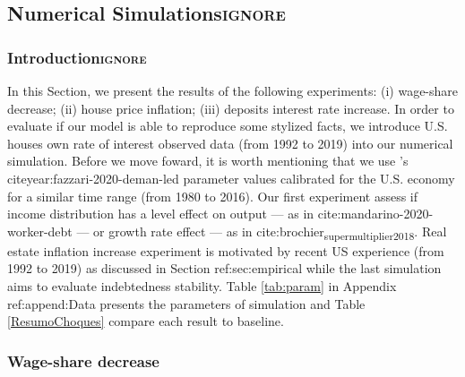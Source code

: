 \documentclass[12pt]{article}
\begin{document}
\subsection{Numerical Simulations\hfill{}\textsc{ignore}}
\label{sec:org3f9a5d6}
\label{sec:Experiments}

\subsubsection{Introduction\hfill{}\textsc{ignore}}
\label{sec:org95a2f11}

In this Section, we present the results of the following experiments: 
    (i) wage-share decrease;
    (ii) house price inflation;
    (iii) deposits interest rate increase.
In order to evaluate if our model is able to reproduce some stylized facts, we introduce U.S. houses own rate of interest observed data (from 1992 to 2019) into our numerical simulation.
Before we move foward, it is worth mentioning that we use \citeauthor*{fazzari-2020-deman-led}'s  citeyear:fazzari-2020-deman-led parameter values calibrated for the U.S. economy for a similar time range (from 1980 to 2016).
Our first experiment assess if income distribution has a level effect on output — as in cite:mandarino-2020-worker-debt — or growth rate effect — as in cite:brochier\textsubscript{supermultiplier}\textsubscript{2018}.
Real estate inflation increase experiment is motivated by recent US experience (from 1992 to 2019) as discussed in Section ref:sec:empirical while the last simulation aims to evaluate indebtedness stability.
Table \ref{tab:param} in Appendix ref:append:Data presents the parameters of simulation and Table \ref{ResumoChoques} compare each result to baseline.

\subsubsection{Wage-share decrease}
\label{sec:org265fea5}
\label{sec:Exp1}
\end{document}
